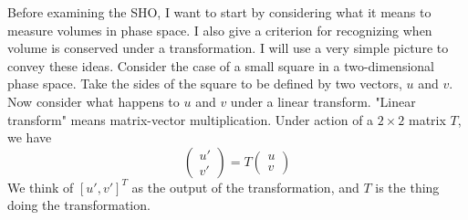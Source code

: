 \documentclass[hidelinks,notitlepage]{book}
\begin{document}
Before examining the SHO, I want to start by considering what it means to measure volumes in phase space.  I also give a criterion for recognizing when volume is conserved under a transformation.  I will use a very simple picture to convey these ideas.  Consider the case of a small square in a two-dimensional phase space.  Take the sides of the square to be defined by two vectors, $u$ and $v$.  Now consider what happens to $u$ and $v$ under a linear transform.  "Linear transform" means matrix-vector multiplication.  Under action of a $2 \times 2$ matrix $T$, we have
\begin{equation}
\label{eq:LinearTransform}
\begin{pmatrix}
 u' \\
 v'
\end{pmatrix}
=
T
\begin{pmatrix}
 u \\
 v
\end{pmatrix}
\end{equation}
We think of $[u', v']^T$ as the output of the transformation, and $T$ is the thing doing the transformation.
\end{document}
